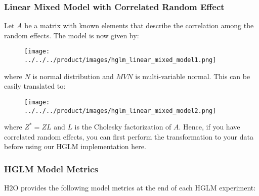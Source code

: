\subsubsection{Linear Mixed Model with Correlated Random Effect}

Let $A$ be a matrix with known elements that describe the correlation among the random effects. The model is now given by:

\begin{figure}[H]
\centering
\texttt{[image: ../../../product/images/hglm\_linear\_mixed\_model1.png]}
\end{figure}

where $N$ is normal distribution and $MVN$ is multi-variable normal. This can be easily translated to:

\begin{figure}[H]
\centering
\texttt{[image: ../../../product/images/hglm\_linear\_mixed\_model2.png]}
\end{figure}

where $Z^* = ZL$ and $L$ is the Cholesky factorization of $A$. Hence, if you have correlated random effects, you can first perform the transformation to your data before using our HGLM implementation here.

\subsubsection{HGLM Model Metrics}

H2O provides the following model metrics at the end of each HGLM experiment:

